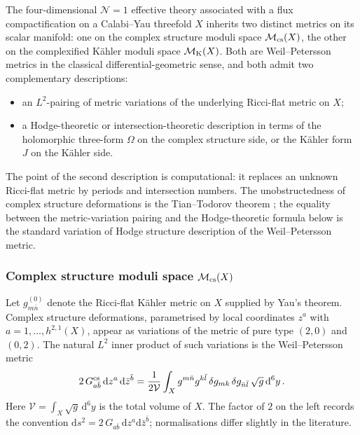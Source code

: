 The four-dimensional $\mathcal{N}=1$ effective theory associated
with a flux compactification on a Calabi--Yau threefold $X$ inherits
two distinct metrics on its scalar manifold: one on the complex
structure moduli space $\mathcal{M}_{\rm cs}(X)$, the other on the
complexified K\"ahler moduli space $\mathcal{M}_{\rm K}(X)$. Both
are Weil--Petersson metrics in the classical
differential-geometric sense, and both admit two complementary
descriptions:
\begin{itemize}
    \item an $L^2$-pairing of metric variations of the underlying
    Ricci-flat metric on $X$;
    \item a Hodge-theoretic or intersection-theoretic description
    in terms of the holomorphic three-form $\Omega$ on the complex
    structure side, or the K\"ahler form $J$ on the K\"ahler side.
\end{itemize}
The point of the second description is computational: it replaces an
unknown Ricci-flat metric by periods and intersection numbers.  The
unobstructedness of complex structure deformations is the
Tian--Todorov theorem \cite{tian1987smoothness,todorov1989weil};
the equality between the metric-variation pairing and the
Hodge-theoretic formula below is the standard
variation of Hodge structure description of the Weil--Petersson
metric.  

\subsubsection*{Complex structure moduli space \texorpdfstring{$\mathcal{M}_{\rm cs}(X)$}{Mcs}}

Let $g^{(0)}_{m\bar n}$ denote the Ricci-flat K\"ahler metric on
$X$ supplied by Yau's theorem.  Complex structure deformations,
parametrised by local coordinates $z^a$ with
$a=1,\ldots,h^{2,1}(X)$, appear as variations of the metric of pure
type $(2,0)$ and $(0,2)$.  The natural $L^2$ inner product of such
variations is the Weil--Petersson metric
\cite{Candelas:1990pi,Candelas:1989ug}
\begin{equation}\label{eq:WP-cs-L2}
    2\,G^{\rm cs}_{a\bar b}\,
    \mathrm{d}z^a\,\mathrm{d}\bar z^{\bar b}
    =
    \frac{1}{2\mathcal{V}}
    \int_X
    g^{m\bar n}g^{k\bar l}\,
    \delta g_{mk}\,\delta g_{\bar n\bar l}\,
    \sqrt{g}\,\mathrm{d}^6y\, .
\end{equation}
Here $\mathcal{V}=\int_X\sqrt{g}\,\mathrm{d}^6y$ is the total
volume of $X$.  The factor of $2$ on the left records the convention
$\mathrm{d}s^2=2\,G_{a\bar b}\,\mathrm{d}z^a\mathrm{d}\bar z^{\bar b}$;
normalisations differ slightly in the literature.

